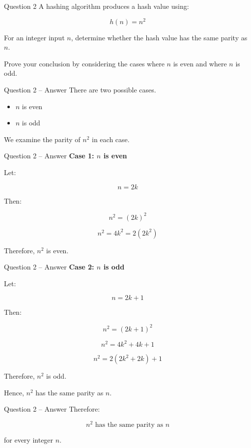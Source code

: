 
\begin{frame}{Question 2}
A hashing algorithm produces a hash value using:

$$
h(n)=n^2
$$

For an integer input $n$, determine whether the hash value has the same
parity as $n$.

Prove your conclusion by considering the cases where $n$ is even and
where $n$ is odd.
\end{frame}

\begin{frame}{Question 2 -- Answer}
There are two possible cases.

\begin{itemize}
\item $n$ is even
\item $n$ is odd
\end{itemize}

We examine the parity of $n^2$ in each case.
\end{frame}

\begin{frame}{Question 2 -- Answer}
\textbf{Case 1: $n$ is even}

Let:

$$
n=2k
$$

Then:

$$
n^2=(2k)^2
$$

$$
n^2=4k^2=2(2k^2)
$$

Therefore, $n^2$ is even.
\end{frame}

\begin{frame}{Question 2 -- Answer}
\textbf{Case 2: $n$ is odd}

Let:

$$
n=2k+1
$$

Then:

$$
n^2=(2k+1)^2
$$

$$
n^2=4k^2+4k+1
$$

$$
n^2=2(2k^2+2k)+1
$$

Therefore, $n^2$ is odd.

Hence, $n^2$ has the same parity as $n$.
\end{frame}

\begin{frame}{Question 2 -- Answer}
Therefore:

$$
\boxed{n^2\text{ has the same parity as }n}
$$

for every integer $n$.
\end{frame}


